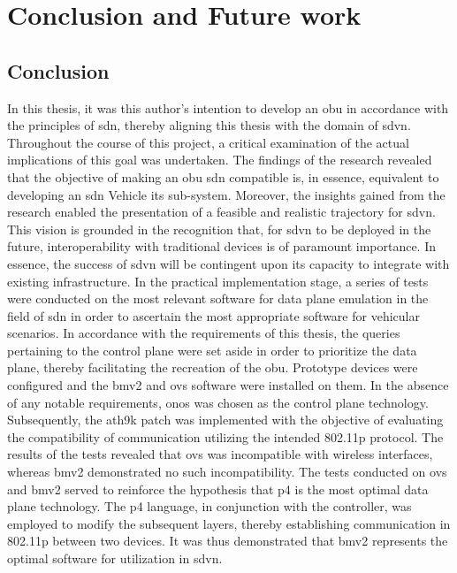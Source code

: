 \chapter{Conclusion and Future work}
\label{cha:conclusion}

\section{Conclusion}
In this thesis, it was this author's intention to develop an \gls{obu} in accordance with the principles of \gls{sdn}, thereby aligning this thesis with the domain of \gls{sdvn}. Throughout the course of this project, a critical examination of the actual implications of this goal was undertaken. The findings of the research revealed that the objective of making an \gls{obu} \gls{sdn} compatible is, in essence, equivalent to developing an \gls{sdn} Vehicle \gls{its} sub-system. Moreover, the insights gained from the research enabled the presentation of a feasible and realistic trajectory for \gls{sdvn}. This vision is grounded in the recognition that, for \gls{sdvn} to be deployed in the future, interoperability with traditional devices is of paramount importance. In essence, the success of \gls{sdvn} will be contingent upon its capacity to integrate with existing infrastructure.
In the practical implementation stage, a series of tests were conducted on the most relevant software for data plane emulation in the field of \gls{sdn} in order to ascertain the most appropriate software for vehicular scenarios. In accordance with the requirements of this thesis, the queries pertaining to the control plane were set aside in order to prioritize the data plane, thereby facilitating the recreation of the \gls{obu}. 
Prototype devices were configured and the \gls{bmv2} and \gls{ovs} software were installed on them. In the absence of any notable requirements, \gls{onos} was chosen as the control plane technology. Subsequently, the ath9k patch was implemented with the objective of evaluating the compatibility of communication utilizing the intended 802.11p protocol. The results of the tests revealed that \gls{ovs} was incompatible with wireless interfaces, whereas \gls{bmv2} demonstrated no such incompatibility.
The tests conducted on \gls{ovs} and \gls{bmv2} served to reinforce the hypothesis that \gls{p4} is the most optimal data plane technology. The \gls{p4} language, in conjunction with the controller, was employed to modify the subsequent layers, thereby establishing communication in 802.11p between two devices. It was thus demonstrated that \gls{bmv2} represents the optimal software for utilization in \gls{sdvn}. 
